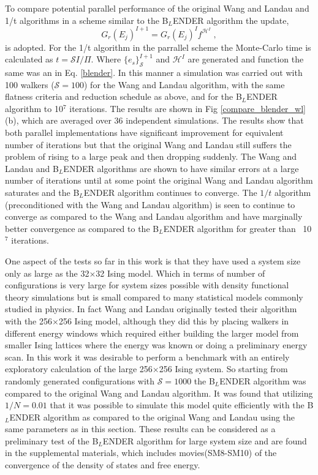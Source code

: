 \documentclass[aps,pre,reprint,superscriptaddress,showkeys]{revtex4-2}
\begin{document}
 To compare potential parallel performance of the original Wang and Landau and 1/t algorithms in a scheme similar to the B$_L$ENDER algorithm the update,
\begin{equation}
G_r(E_j)^{I+1} = G_r(E_j)^{I}f^{\mathcal{H}^I}\;,
\label{parallelscheme}
\end{equation}
is adopted. For the 1/t algorithm in the parrallel scheme the Monte-Carlo time is calculated as $t = \mathcal{S}I/\Pi$. Where $\{e_s\}^{I+1}_{\mathcal{S}}$ and $\mathcal{H}^I$ are generated and function the same was an in Eq. \ref{blender}. In this manner a simulation was carried out with 100 walkers ($\mathcal{S}=100$) for the Wang and Landau algorithm, with the same flatness criteria and reduction schedule as above, and for the B$_L$ENDER algorithm to 10$^7$ iterations. The results are shown in Fig \ref{compare_blender_wl}(b), which are averaged over 36 independent simulations. The results show that both parallel implementations have significant improvement for equivalent number of iterations but that the original Wang and Landau still suffers the problem of rising to a large peak and then dropping suddenly. The Wang and Landau and B$_L$ENDER algorithms are shown to have similar errors at a large number of iterations until at some point the original Wang and Landau algorithm saturates and the B$_L$ENDER algorithm continues to converge. The $1/t$ algorithm (preconditioned with the Wang and Landau algorithm) is seen to continue to converge as compared to the Wang and Landau algorithm and have marginally better convergence as compared to the B$_L$ENDER algorithm for greater than ~10$^7$ iterations. 

  One aspect of the tests so far in this work is that they have used a system size only as large as the 32$\times$32 Ising model.  Which in terms of number of configurations is very large for system sizes possible with density functional theory simulations but is small compared to many statistical models commonly studied in physics.  In fact Wang and Landau originally tested their algorithm with the 256$\times$256 Ising model\cite{WL_phys_rev_lett}, although they did this by placing walkers in different energy windows which required either building the larger model from smaller Ising lattices where the energy was known or doing a preliminary energy scan.  In this work it was desirable to perform a benchmark with an entirely exploratory calculation of the large 256$\times$256 Ising system. So starting from randomly generated configurations with $\mathcal{S}=1000$ the B$_L$ENDER algorithm was compared to the original Wang and Landau algorithm. It was found that utilizing $1/N=0.01$ that it was possible to simulate this model quite efficiently with the B$_L$ENDER algorithm as compared to the original Wang and Landau using the same parameters as in this section. These results can be considered as a preliminary test of the B$_L$ENDER algorithm for large system size and are found in the supplemental materials, which includes movies(SM8-SM10) of the convergence of the density of states and free energy. 
\end{document}
